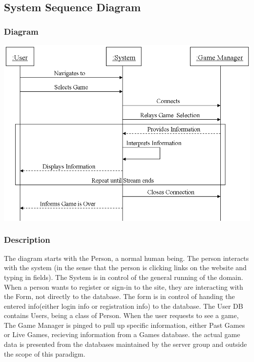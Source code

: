 %

	\subsection{System Sequence Diagram}
	
		\subsubsection{Diagram}
			\includegraphics[width=1.0\textwidth]{./SSD_of_Watch_Live.png}
			
		\subsubsection{Description}
			The diagram starts with the Person, a normal human being. The person interacts with the system (in the sense that the person is clicking links on the website and typing in fields). The System is in control of the general running of the domain. When a person wants to register or sign-in to the site, they are interacting with the Form, not directly to the database. The form is in control of handing the entered info(either login info or registration info) to the database. The User DB contains Users, being a class of Person. When the user requests to see a game, The Game Manager is pinged to pull up specific information, either Past Games or Live Games, recieving information from a Games database. the actual game data is presented from the databases maintained by the server group and outside the scope of this paradigm.
